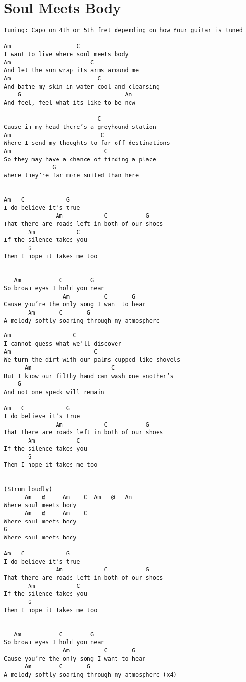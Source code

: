\documentclass[leqno]{memoir}
\begin{document}
\chapter{Soul Meets Body}
\begin{verbatim}
Tuning: Capo on 4th or 5th fret depending on how Your guitar is tuned

Am                   C
I want to live where soul meets body
Am                       C
And let the sun wrap its arms around me
Am                         C
And bathe my skin in water cool and cleansing
    G                              Am
And feel, feel what its like to be new

                           C
Cause in my head there’s a greyhound station
Am                          C
Where I send my thoughts to far off destinations
Am                           C
So they may have a chance of finding a place
              G
where they’re far more suited than here


Am   C            G
I do believe it’s true
               Am            C           G
That there are roads left in both of our shoes
       Am            C
If the silence takes you
       G
Then I hope it takes me too


   Am           C        G
So brown eyes I hold you near
                 Am          C       G
Cause you’re the only song I want to hear
       Am       C       G
A melody softly soaring through my atmosphere
\end{verbatim}
\newpage
\begin{verbatim}
Am                  C
I cannot guess what we'll discover
Am                        C
We turn the dirt with our palms cupped like shovels
      Am                       C
But I know our filthy hand can wash one another’s
    G
And not one speck will remain

Am   C            G
I do believe it’s true
               Am            C           G
That there are roads left in both of our shoes
       Am            C
If the silence takes you
       G
Then I hope it takes me too


(Strum loudly)
      Am   @     Am    C  Am   @   Am    
Where soul meets body                    
      Am   @     Am    C
Where soul meets body
G
Where soul meets body

Am   C            G
I do believe it’s true
               Am            C           G
That there are roads left in both of our shoes
       Am            C
If the silence takes you
       G
Then I hope it takes me too


   Am           C        G
So brown eyes I hold you near
                 Am          C       G
Cause you’re the only song I want to hear
      Am        C       G
A melody softly soaring through my atmosphere (x4)
\end{verbatim}
\newpage
\end{document}
